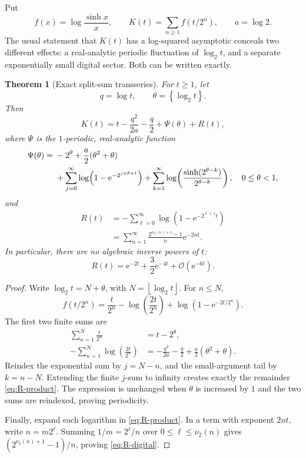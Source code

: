 \documentclass[11pt,oneside]{article}
\newtheorem{theorem}{Theorem}[section]
\theoremstyle{definition}
\theoremstyle{remark}
\newcommand{\e}{\mathrm e}
\newcommand{\bigO}{\mathcal O}
\begin{document}
Put
\[
 f(x)=\log\frac{\sinh x}{x},
 \qquad
 K(t)=\sum_{n\geq1}f(t/2^n),
 \qquad a=\log2.
\]
The usual statement that \(K(t)\) has a log-squared asymptotic conceals two
different effects: a real-analytic periodic fluctuation of \(\log_2t\), and a
separate exponentially small digital sector.  Both can be written exactly.

\begin{theorem}[Exact split-sum transseries]
\label{thm:exact-transseries}
For \(t\geq1\), let
\[
 q=\log t,\qquad \theta=\left\{\log_2t\right\}.
\]
Then
\begin{equation}
 \boxed{\displaystyle
 K(t)
 =t-\frac{q^2}{2a}-\frac q2+\Psi(\theta)+R(t),}
 \label{eq:K-transseries}
\end{equation}
where \(\Psi\) is the \(1\)-periodic, real-analytic function
\begin{align}
 \Psi(\theta)
 ={}&
 -2^\theta+\frac a2(\theta^2+\theta)
 \notag\\
 &+\sum_{j=0}^{\infty}
   \log\!\left(1-\e^{-2^{j+\theta+1}}\right)
 +\sum_{k=1}^{\infty}
   \log\!\left(
    \frac{\sinh(2^{\theta-k})}{2^{\theta-k}}
   \right),
 \quad 0\leq\theta<1,
 \label{eq:Psi-split}
\end{align}
and
\begin{align}
 R(t)
 &=-\sum_{\ell=0}^{\infty}
   \log\!\left(1-\e^{-2^{\ell+1}t}\right)
 \label{eq:R-product}\\
 &=\sum_{n=1}^{\infty}
   \frac{2^{\nu_2(n)+1}-1}{n}\e^{-2nt}.
 \label{eq:R-digital}
\end{align}
In particular, there are no algebraic inverse powers of \(t\):
\[
 R(t)=\e^{-2t}+\frac32\e^{-4t}+\bigO(\e^{-6t}).
\]
\end{theorem}

\begin{proof}
Write \(\log_2t=N+\theta\), with
\(N=\left\lfloor\log_2t\right\rfloor\).  For \(n\leq N\),
\[
 f(t/2^n)
 =\frac{t}{2^n}
  -\log\!\left(\frac{2t}{2^n}\right)
  +\log\!\left(1-\e^{-2t/2^n}\right).
\]
The first two finite sums are
\begin{align*}
 \sum_{n=1}^{N}\frac{t}{2^n}&=t-2^\theta,\\
 -\sum_{n=1}^{N}\log\!\left(\frac{2t}{2^n}\right)
 &=-\frac{q^2}{2a}-\frac q2+\frac a2(\theta^2+\theta).
\end{align*}
Reindex the exponential sum by \(j=N-n\), and the small-argument tail by
\(k=n-N\).  Extending the finite \(j\)-sum to infinity creates exactly the
remainder \eqref{eq:R-product}.  The expression is unchanged when
\(\theta\) is increased by \(1\) and the two sums are reindexed, proving
periodicity.

Finally, expand each logarithm in \eqref{eq:R-product}.  In a term with
exponent \(2nt\), write \(n=m2^\ell\).  Summing \(1/m=2^\ell/n\) over
\(0\leq\ell\leq\nu_2(n)\) gives
\((2^{\nu_2(n)+1}-1)/n\), proving \eqref{eq:R-digital}.
\end{proof}
\end{document}
